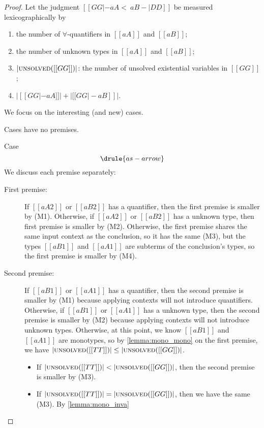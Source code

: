\decsubtype*
\begin{proof}
  Let the judgment $[[ GG |- aA <~ aB -| DD   ]]$ be measured lexicographically by
 \begin{enumerate}[(M1)]
\item the number of $\forall$-quantifiers in $[[aA]]$ and $[[aB]]$;
\item the number of unknown types in $[[aA]]$ and $[[aB]]$;
\item $| \textsc{unsolved}([[GG]]) |$: the number of unsolved existential
  variables in $[[GG]]$;
\item $| [[GG |- aA]] | + | [[GG |- aB]]   |$.
\end{enumerate}

We focus on the interesting (and new) cases.

\begin{asparaitem}
\item Cases  have no premises.
\item Case \[  \drule{as-arrow}   \]
  We discuss each premise separately:
  \begin{description}
    \item[First premise:]
      If $[[aA2]]$ or $[[aB2]]$ has a quantifier, then the first premise is smaller by (M1). Otherwise, if $[[aA2]]$ or $[[aB2]]$
      has a unknown type, then first premise is smaller by (M2). Otherwise, the first premise shares the same input context as the conclusion, so it
      has the same (M3), but the types $[[aB1]]$ and $[[aA1]]$ are subterms of the conclusion's types, so the first premise is smaller by (M4).
    \item[Second premise:] If $[[aB1]]$ or $[[aA1]]$ has a quantifier, then the second premise is smaller by (M1) because
      applying contexts will not introduce quantifiers. Otherwise,
      if $[[aB1]]$ or $[[aA1]]$ has a unknown type, then the second premise is smaller by (M2) because
      applying contexts will not introduce unknown types. Otherwise, at this point, we know
      $[[aB1]]$ and $[[aA1]]$ are monotypes, so by \cref{lemma:mono_mono} on the first premise,
      we have $| \textsc{unsolved}([[TT]])  | \leq | \textsc{unsolved}([[GG]])   |$.
      \begin{itemize}
      \item If $| \textsc{unsolved}([[TT]])  | < | \textsc{unsolved}([[GG]])   |$, then the second premise is smaller by (M3).
      \item If $| \textsc{unsolved}([[TT]])  | = | \textsc{unsolved}([[GG]])   |$, then we have the same (M3). By \cref{lemma:mono_inva}

\end{itemize}
\end{description}
\end{asparaitem}
\end{proof}

